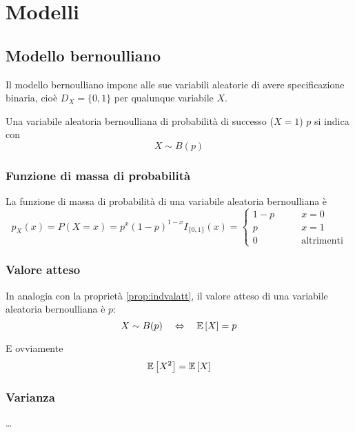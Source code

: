 \section{Modelli}

\subsection{Modello bernoulliano}
Il modello bernoulliano impone alle sue variabili aleatorie di avere specificazione binaria, cioè $D_X=\{0,1\}$ per qualunque variabile $X$.

Una variabile aleatoria bernoulliana di probabilità di successo ($X=1$) $p$ si indica con
\begin{equation*}
	X\sim B(p)
\end{equation*}


\subsubsection{Funzione di massa di probabilità}
La funzione di massa di probabilità di una variabile aleatoria bernoulliana è
\begin{equation*}
	p_X(x)=P(X=x)=p^x(1-p)^{1-x}I_{\{0,1\}}(x)=\begin{cases}
		1-p \qquad & x=0               \\
		p \qquad   & x=1               \\
		0 \qquad   & \text{altrimenti}
	\end{cases}
\end{equation*}


\subsubsection{Valore atteso}
In analogia con la proprietà \ref{prop:indvalatt}, il valore atteso di una variabile aleatoria bernoulliana è $p$:
\begin{equation*}
	X\sim B(p) \quad\Leftrightarrow\quad \mathbb{E}\left[ X \right] = p
\end{equation*}

E ovviamente
\begin{equation*}
	\mathbb{E}\left[ X^2 \right]=\mathbb{E}\left[ X \right]
\end{equation*}


\subsubsection{Varianza}
\dots


